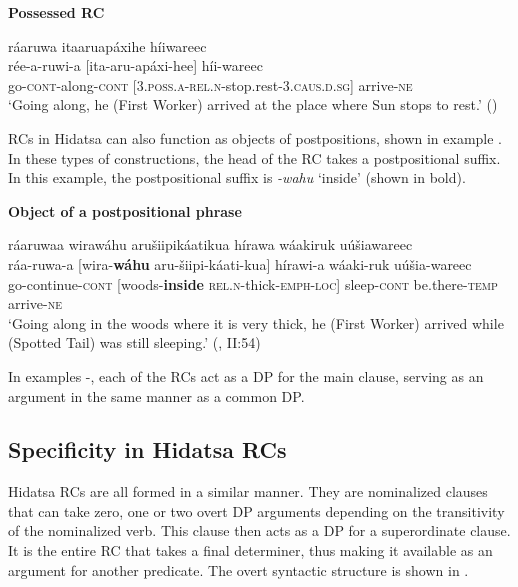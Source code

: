 \documentclass[output=paper]{LSP/langsci}
\begin{document}
\ea \textbf{Possessed RC} \label{boyle4}

\glll r\'aaruwa  {\ob}itaaruap\'axihe{\cb}   h\'iiwareec\\
r\'ee-a-ruwi-a  [ita-aru-ap\'axi-hee] h\'ii-wareec\\
go-\textsc{cont}-along-\textsc{cont} [\textsc{3.poss.a-rel.n}-stop.rest-\textsc{3.caus.d.sg}] arrive-\textsc{ne}\\
\trans `Going along, he (First Worker) arrived at the place where Sun stops to rest.' (\citealt[I: 21]{Lowie1939})
\z

RCs in Hidatsa can also function as objects of postpositions, shown in example . In these types of constructions, the head of the RC takes a postpositional suffix. In this example, the postpositional suffix is \textit{-wahu} `inside' (shown in bold). 

\ea \textbf{Object of a postpositional phrase} \label{boyle5}

\glll r\'aaruwaa   {\ob}wiraw\'ahu  aru\v{s}iipik\'aatikua{\cb}   h\'irawa w\'aakiruk u\'u\v{s}iawareec\\
r\'aa-ruwa-a [wira-\textbf{w\'ahu} aru-\v{s}iipi-k\'aati-kua] h\'irawi-a w\'aaki-ruk u\'u\v{s}ia-wareec\\     
go-continue-\textsc{cont} [woods-\textbf{inside}  \textsc{rel.n}-thick-\textsc{emph-loc}] sleep-\textsc{cont} be.there-\textsc{temp} arrive-\textsc{ne}\\
\trans `Going along in the woods where it is very thick, he (First Worker) arrived while (Spotted Tail) was still sleeping.' (\citealt{Lowie1939}, II:54)
\z

In examples -, each of the RCs act as a DP for the main clause, serving as an argument in the same manner as a common DP.

\subsection{Specificity in Hidatsa RCs}\label{sec:boyle:2.2}

Hidatsa RCs are all formed in a similar manner. They are nominalized clauses that can take zero, one or two overt DP arguments depending on the transitivity of the nominalized verb. This clause then acts as a DP for a superordinate clause. It is the entire RC that takes a final determiner, thus making it available as an argument for another predicate. The overt syntactic structure is shown in .
\end{document}
